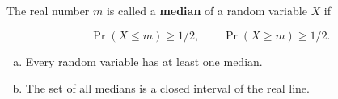 \begin{definition} The real number \(m\) is called a \textbf{median} of a random variable \(X\) if

\[
\Pr(X \leq m) \geq 1/2, \qquad \Pr(X \geq m) \geq 1/2.
\]

\end{definition}

\begin{proposition} 

\begin{enumerate}[(a)]

\item Every random variable has at least one median. 

\item The set of all medians is a closed interval of the real line.

\end{enumerate}

\end{proposition}

